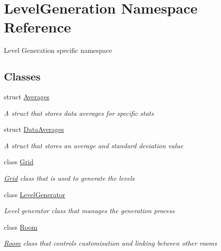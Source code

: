 \hypertarget{namespace_level_generation}{}\section{Level\+Generation Namespace Reference}
\label{namespace_level_generation}


Level Generation specific namespace  


\subsection*{Classes}
\begin{DoxyCompactItemize}
\item 
struct \mbox{\hyperlink{struct_level_generation_1_1_averages}{Averages}}
\begin{DoxyCompactList}\small\item\em A struct that stores data averages for specific stats \end{DoxyCompactList}\item 
struct \mbox{\hyperlink{struct_level_generation_1_1_data_averages}{Data\+Averages}}
\begin{DoxyCompactList}\small\item\em A struct that stores an average and standard deviation value \end{DoxyCompactList}\item 
class \mbox{\hyperlink{class_level_generation_1_1_grid}{Grid}}
\begin{DoxyCompactList}\small\item\em \mbox{\hyperlink{class_level_generation_1_1_grid}{Grid}} class that is used to generate the levels \end{DoxyCompactList}\item 
class \mbox{\hyperlink{class_level_generation_1_1_level_generator}{Level\+Generator}}
\begin{DoxyCompactList}\small\item\em Level generator class that manages the generation process \end{DoxyCompactList}\item 
class \mbox{\hyperlink{class_level_generation_1_1_room}{Room}}
\begin{DoxyCompactList}\small\item\em \mbox{\hyperlink{class_level_generation_1_1_room}{Room}} class that controls customisation and linking between other rooms \end{DoxyCompactList}\item 

\end{DoxyCompactItemize}
